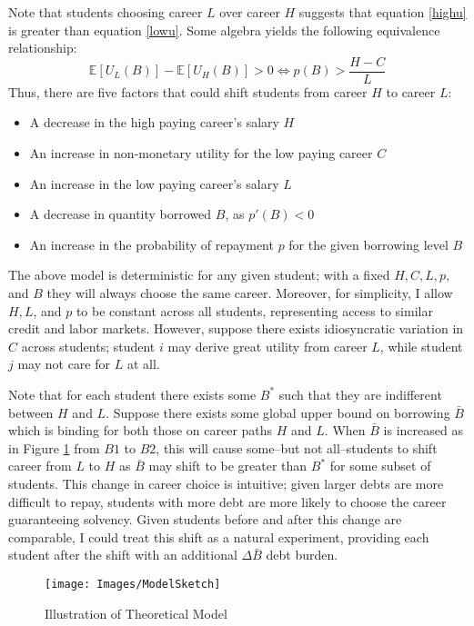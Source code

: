 \documentclass[12pt]{article}
\begin{document}
	Note that students choosing career $L$ over career $H$ suggests that equation \ref{highu} is greater than equation \ref{lowu}. Some algebra yields the following equivalence relationship: 
	\begin{equation}
	\mathbb{E}\left[U_L(B)\right] - \mathbb{E}\left[U_H(B)\right] > 0 \iff p(B) > \frac{H - C}{L} \label{choicecon}
	\end{equation} 
	Thus, there are five factors that could shift students from career $H$ to career $L$:
	\begin{itemize}
		\singlespacing
		\item A decrease in the high paying career's salary $H$
		\item An increase in non-monetary utility for the low paying career $C$
		\item An increase in the low paying career's salary $L$
		\item A decrease in quantity borrowed $B$, as $p'(B) < 0$
		\item An increase in the probability of repayment $p$ for the given borrowing level $B$
	\end{itemize}

	The above model is deterministic for any given student; with a fixed $H, C, L, p,$ and $B$ they will always choose the same career. Moreover, for simplicity, I allow $H, L$, and $p$ to be constant across all students, representing access to similar credit and labor markets. However, suppose there exists idiosyncratic variation in $C$ across students; student $i$ may derive great utility from career $L$, while student $j$ may not care for $L$ at all.

	Note that for each student there exists some $B^*$ such that they are indifferent between $H$ and $L$. Suppose there exists some global upper bound on borrowing $\bar{B}$ which is binding for both those on career paths $H$ and $L$. When $\bar{B}$ is increased as in Figure \ref{struc} from $B1$ to $B2$, this will cause some--but not all--students to shift career from $L$ to $H$ as $\bar{B}$ may shift to be greater than $B^*$ for some subset of students. This change in career choice is intuitive; given larger debts are more difficult to repay, students with more debt are more likely to choose the career guaranteeing solvency. Given students before and after this change are comparable, I could treat this shift as a natural experiment, providing each student after the shift with an additional $\Delta\bar{B}$ debt burden. 
	
		
	\begin{figure}
		\centering
		\caption{Illustration of Theoretical Model}
		\label{struc}
		\texttt{[image: Images/ModelSketch]}
	\end{figure}
\end{document}
